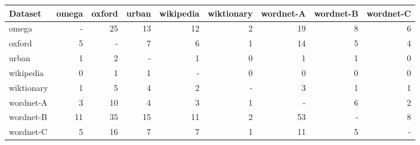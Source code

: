 \begin{tabular}{|l|rrrrrrrr|}
    \hline
    Dataset    & omega & oxford & urban & wikipedia & wiktionary & wordnet-A & wordnet-B & wordnet-C \\
    \hline
    omega      & -     & 25     & 13    & 12        & 2          & 19        & 8         & 6         \\
    oxford     & 5     & -      & 7     & 6         & 1          & 14        & 5         & 4         \\
    urban      & 1     & 2      & -     & 1         & 0          & 1         & 1         & 0         \\
    wikipedia  & 0     & 1      & 1     & -         & 0          & 0         & 0         & 0         \\
    wiktionary & 1     & 5      & 4     & 2         & -          & 3         & 1         & 1         \\
    wordnet-A  & 3     & 10     & 4     & 3         & 1          & -         & 6         & 2         \\
    wordnet-B  & 11    & 35     & 15    & 11        & 2          & 53        & -         & 8         \\
    wordnet-C  & 5     & 16     & 7     & 7         & 1          & 11        & 5         & -         \\
    \hline
\end{tabular}
